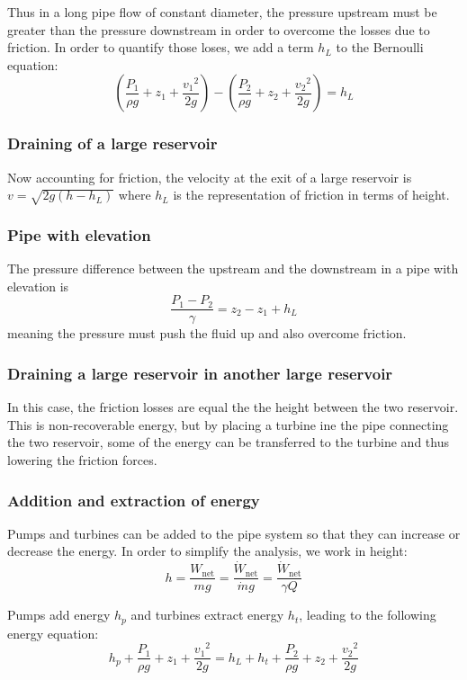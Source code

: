 \documentclass[10pt, twocolumn]{article}
\begin{document}
Thus in a long pipe flow of constant diameter, the pressure upstream must be greater than the pressure downstream in order to overcome the losses due to friction.
In order to quantify those loses, we add a term \(h_L\) to the Bernoulli equation:
\[
  \left( \frac{P_1}{\rho g} + z_1 + \frac{{v_1}^2}{2g} \right) - \left( \frac{P_2}{\rho g} + z_2 + \frac{{v_2}^2}{2g} \right) = h_L
\]


\subsubsection{Draining of a large reservoir}
Now accounting for friction, the velocity at the exit of a large reservoir is \(v = \sqrt{2g(h - h_L)}\) where \(h_L\) is the representation of friction in terms of height.


\subsubsection{Pipe with elevation}
The pressure difference between the upstream and the downstream in a pipe with elevation is
\[
  \frac{P_1 - P_2}{\gamma} = z_2 - z_1 + h_L
\]
meaning the pressure must push the fluid up and also overcome friction.


\subsubsection{Draining a large reservoir in another large reservoir}
In this case, the friction losses are equal the the height between the two reservoir.
This is non-recoverable energy, but by placing a turbine ine the pipe connecting the two reservoir, some of the energy can be transferred to the turbine and thus lowering the friction forces.


\subsubsection{Addition and extraction of energy}
Pumps and turbines can be added to the pipe system so that they can increase or decrease the energy.
In order to simplify the analysis, we work in height:
\[
  h = \frac{W_\mathrm{net}}{mg} = \frac{\dot{W}_\mathrm{net}}{\dot{m}g} = \frac{\dot{W}_\mathrm{net}}{\gamma Q}
\]

Pumps add energy \(h_p\) and turbines extract energy \(h_t\), leading to the following energy equation:
\[
  h_p + \frac{P_1}{\rho g} + z_1 + \frac{{v_1}^2}{2g} = h_L + h_t + \frac{P_2}{\rho g} + z_2 + \frac{{v_2}^2}{2g}
\]
\end{document}
